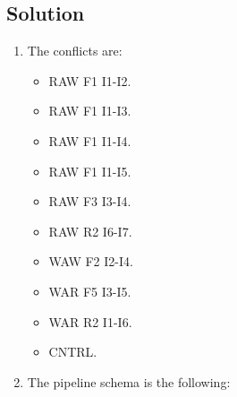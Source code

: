 \subsection*{Solution}
\begin{enumerate}
    \item The conflicts are: 
        \begin{itemize}
            \item RAW F1 I1-I2.
            \item RAW F1 I1-I3.
            \item RAW F1 I1-I4.
            \item RAW F1 I1-I5.
            \item RAW F3 I3-I4.
            \item RAW R2 I6-I7.
            \item WAW F2 I2-I4.
            \item WAR F5 I3-I5.
            \item WAR R2 I1-I6.
            \item CNTRL.
        \end{itemize}
    \item The pipeline schema is the following: 
        \begin{table}[H]
            \centering
\end{table}
\end{enumerate}
